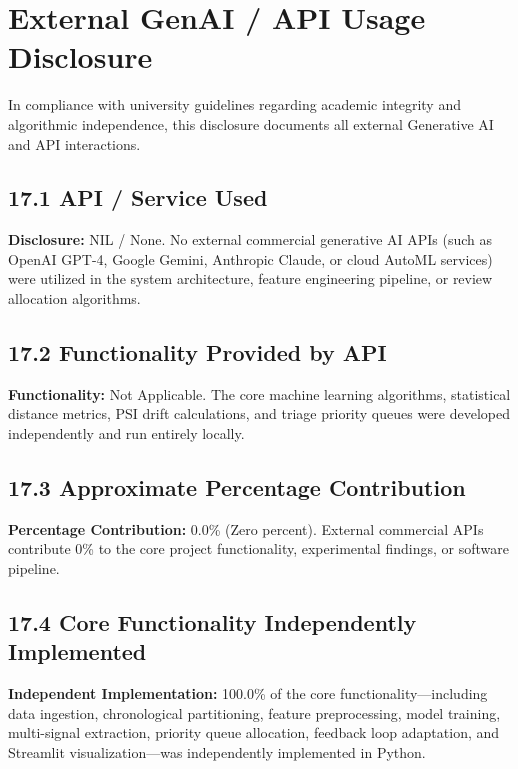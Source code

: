 \section{External GenAI / API Usage Disclosure}

In compliance with university guidelines regarding academic integrity and algorithmic independence, this disclosure documents all external Generative AI and API interactions.

\subsection{17.1 API / Service Used}

\textbf{Disclosure:} NIL / None. No external commercial generative AI APIs (such as OpenAI GPT-4, Google Gemini, Anthropic Claude, or cloud AutoML services) were utilized in the system architecture, feature engineering pipeline, or review allocation algorithms.

\subsection{17.2 Functionality Provided by API}

\textbf{Functionality:} Not Applicable. The core machine learning algorithms, statistical distance metrics, PSI drift calculations, and triage priority queues were developed independently and run entirely locally.

\subsection{17.3 Approximate Percentage Contribution}

\textbf{Percentage Contribution:} 0.0\% (Zero percent). External commercial APIs contribute 0\% to the core project functionality, experimental findings, or software pipeline.

\subsection{17.4 Core Functionality Independently Implemented}

\textbf{Independent Implementation:} 100.0\% of the core functionality---including data ingestion, chronological partitioning, feature preprocessing, model training, multi-signal extraction, priority queue allocation, feedback loop adaptation, and Streamlit visualization---was independently implemented in Python.

